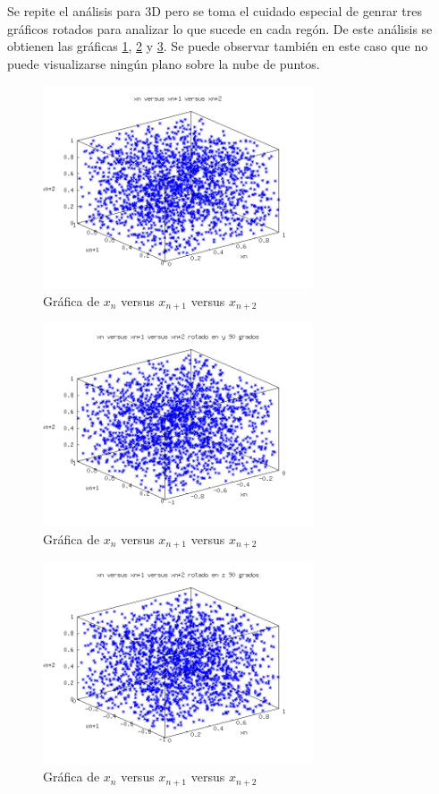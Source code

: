 \documentclass{sig-alternate}
\begin{document}
Se repite el an\'alisis para 3D pero se toma el cuidado especial de genrar tres gr\'aficos rotados
para analizar lo que sucede en cada reg\'on. De este an\'alisis se obtienen las gr\'aficas
\ref{fig:ecuyer_3D_1}, \ref{fig:ecuyer_3D_2} y \ref{fig:ecuyer_3D_3}. Se puede observar
tambi\'en en este caso que no puede visualizarse ning\'un plano sobre la nube de puntos. \\

\begin{figure}[ht]
\label{fig:ecuyer_3D_1}
\includegraphics[width=8cm]{ecuyer3D_1}
\caption{Gr\'afica de $x_{n}$ versus $x_{n+1}$ versus $x_{n+2}$}
\end{figure}

\begin{figure}[ht]
\label{fig:ecuyer_3D_2}
\includegraphics[width=8cm]{ecuyer3D_2}
\caption{Gr\'afica de $x_{n}$ versus $x_{n+1}$ versus $x_{n+2}$}
\end{figure}

\begin{figure}[ht]
\label{fig:ecuyer_3D_3}
\includegraphics[width=8cm]{ecuyer3D_3}
\caption{Gr\'afica de $x_{n}$ versus $x_{n+1}$ versus $x_{n+2}$}
\end{figure}
\end{document}
